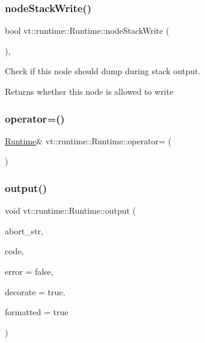 \subsubsection{\texorpdfstring{node\+Stack\+Write()}{nodeStackWrite()}}
{\footnotesize\ttfamily bool vt\+::runtime\+::\+Runtime\+::node\+Stack\+Write (\begin{DoxyParamCaption}{ }\end{DoxyParamCaption})\hspace{0.3cm}{\ttfamily [static]}, {\ttfamily [private]}}



Check if this node should dump during stack output. 

\begin{DoxyReturn}{Returns}
whether this node is allowed to write 
\end{DoxyReturn}
\mbox{\label{structvt_1_1runtime_1_1_runtime_a30e1ddf6dd4950488044cf9608402193}} 
\subsubsection{\texorpdfstring{operator=()}{operator=()}}
{\footnotesize\ttfamily \hyperlink{structvt_1_1runtime_1_1_runtime}{Runtime}\& vt\+::runtime\+::\+Runtime\+::operator= (\begin{DoxyParamCaption}\item[{\hyperlink{structvt_1_1runtime_1_1_runtime}{Runtime} const \&}]{ }\end{DoxyParamCaption})\hspace{0.3cm}{\ttfamily [delete]}}

\mbox{\label{structvt_1_1runtime_1_1_runtime_af9784d4fc19d1df2b86b2c8e01d15295}} 
\subsubsection{\texorpdfstring{output()}{output()}}
{\footnotesize\ttfamily void vt\+::runtime\+::\+Runtime\+::output (\begin{DoxyParamCaption}\item[{std\+::string const}]{abort\+\_\+str,  }\item[{\hyperlink{namespacevt_a793764d753923abc3d32929870beb485}{Error\+Code\+Type} const}]{code,  }\item[{bool}]{error = {\ttfamily false},  }\item[{bool}]{decorate = {\ttfamily true},  }\item[{bool}]{formatted = {\ttfamily true} }\end{DoxyParamCaption})}



